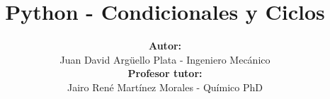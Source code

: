 \documentclass[20]{beamer}
\title[ACMA]{\textbf{Python - Condicionales y Ciclos}}
\author[Juan David]{
\textbf{Autor:}\\
Juan David Argüello Plata - Ingeniero Mecánico\\
\vspace{5pt}
\textbf{Profesor tutor:}\\
Jairo René Martínez Morales - Químico PhD
}
\institute[UIS]{
	CENIVAM\\
	Universidad Industrial de Santander
}
\date{}
\begin{document}
\begin{frame}
\titlepage
\end{frame}








\end{document}
